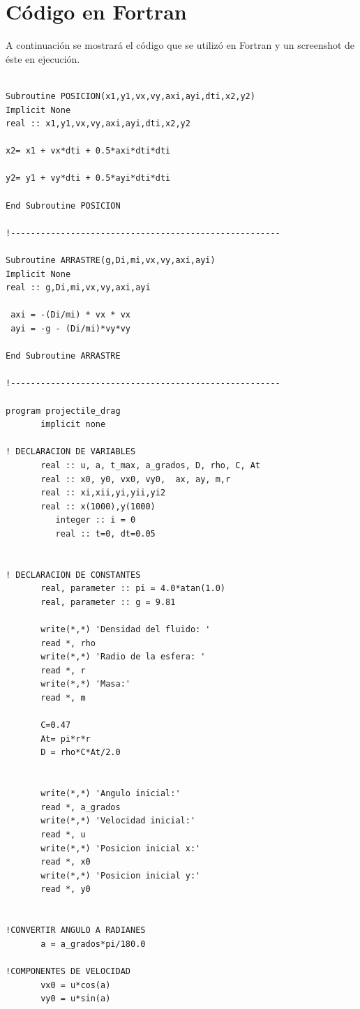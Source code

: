 \documentclass[10pt,a4paper]{article}
\begin{document}
\section*{C\'odigo en Fortran}

A continuaci\'on se mostrar\'a el c\'odigo que se utiliz\'o en Fortran y un screenshot de \'este en ejecuci\'on.   

\begin{verbatim}

Subroutine POSICION(x1,y1,vx,vy,axi,ayi,dti,x2,y2)
Implicit None
real :: x1,y1,vx,vy,axi,ayi,dti,x2,y2

x2= x1 + vx*dti + 0.5*axi*dti*dti

y2= y1 + vy*dti + 0.5*ayi*dti*dti

End Subroutine POSICION

!------------------------------------------------------

Subroutine ARRASTRE(g,Di,mi,vx,vy,axi,ayi)
Implicit None
real :: g,Di,mi,vx,vy,axi,ayi

 axi = -(Di/mi) * vx * vx
 ayi = -g - (Di/mi)*vy*vy

End Subroutine ARRASTRE

!------------------------------------------------------

program projectile_drag  
       implicit none  

! DECLARACION DE VARIABLES
       real :: u, a, t_max, a_grados, D, rho, C, At
       real :: x0, y0, vx0, vy0,  ax, ay, m,r
       real :: xi,xii,yi,yii,yi2
       real :: x(1000),y(1000)  
          integer :: i = 0
          real :: t=0, dt=0.05


! DECLARACION DE CONSTANTES
       real, parameter :: pi = 4.0*atan(1.0) 
       real, parameter :: g = 9.81

       write(*,*) 'Densidad del fluido: '
       read *, rho
       write(*,*) 'Radio de la esfera: '
       read *, r
       write(*,*) 'Masa:'   
       read *, m

       C=0.47
       At= pi*r*r
       D = rho*C*At/2.0
     

       write(*,*) 'Angulo inicial:'   
       read *, a_grados   
       write(*,*) 'Velocidad inicial:'   
       read *, u   
       write(*,*) 'Posicion inicial x:'   
       read *, x0   
       write(*,*) 'Posicion inicial y:'   
       read *, y0
 

!CONVERTIR ANGULO A RADIANES 
       a = a_grados*pi/180.0   
       
!COMPONENTES DE VELOCIDAD
       vx0 = u*cos(a)
       vy0 = u*sin(a)


\end{verbatim}
\end{document}
